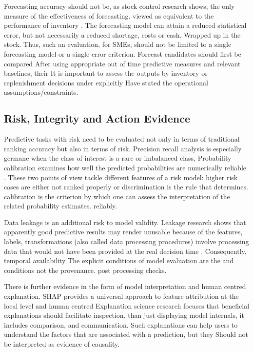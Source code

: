 \documentclass[a4paper,11pt,oneside]{book}
\theoremstyle{plain}
\theoremstyle{definition}
\theoremstyle{remark}
\begin{document}
Forecasting accuracy should not be, as stock control research shows, the only measure of the effectiveness of forecasting. viewed as equivalent to the performance of inventory \cite{syntetos2010stock}. The forecasting model can attain a reduced statistical error, but not necessarily a reduced shortage, costs or cash. Wrapped up in the stock. Thus, such an evaluation, for SMEs, should not be limited to a single forecasting model or a single error criterion. Forecast candidates should first be compared After using appropriate out of time predictive measures and relevant baselines, their It is important to assess the outputs by inventory or replenishment decisions under explicitly Have stated the operational assumptions/constraints.

\subsection{Risk, Integrity and Action Evidence}

Predictive tasks with risk need to be evaluated not only in terms of traditional ranking accuracy but also in terms of risk. Precision recall analysis is especially germane when the class of interest is a rare or imbalanced class, Probability calibration examines how well the predicted probabilities are numerically reliable \cite{niculescu2005calibration,saito2015pr}. These two points of view tackle different features of a risk model: higher risk cases are either not ranked properly or discrimination is the rule that determines. calibration is the criterion by which one can assess the interpretation of the related probability estimates. reliably.

Data leakage is an additional risk to model validity. Leakage research shows that apparently good predictive results may render unusable because of the features, labels, transformations (also called data processing procedures) involve processing data that would not have been provided at the real decision time \cite{kaufman2012leakage}. Consequently, temporal availability The explicit conditions of model evaluation are the and conditions not the provenance. post processing checks.

There is further evidence in the form of model interpretation and human centred explanation. SHAP provides a universal approach to feature attribution at the local level \cite{lundberg2017shap} and human centred Explanation science research focuses that beneficial explanations should facilitate inspection, than just displaying model internals, it includes comparison, and communication. Such explanations can help users to understand the factors that are associated with a prediction, but they Should not be interpreted as evidence of causality.
\end{document}
